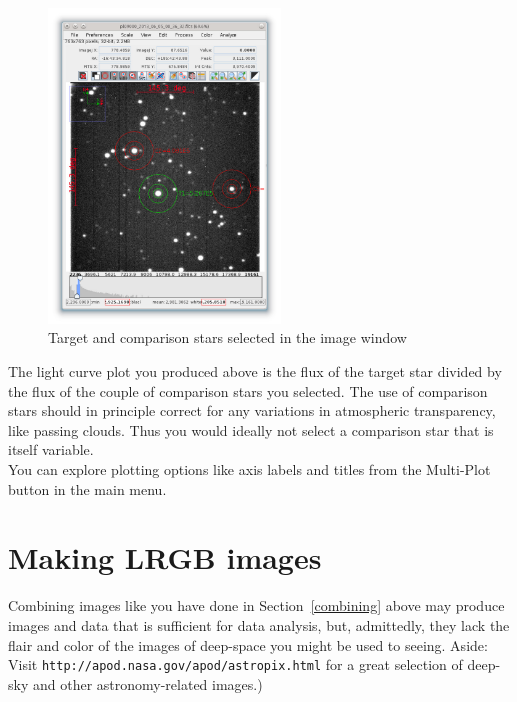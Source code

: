 \documentclass[12pt,twoside,a4paper]{report}
\begin{document}
\begin{enumerate}
  \begin{figure}[ht]
  \centering
    \includegraphics[width=0.55\textwidth]{documentation_images/photometry_targets.jpg}
    \caption{\label{fig:targets}Target and comparison stars selected in the image window}
 \end{figure}
 \end{enumerate}

The light curve plot you produced above is the flux of the target star divided by the flux of the couple of comparison stars you selected. The use of comparison stars should in principle correct for any variations in atmospheric transparency, like passing clouds. Thus you would ideally not select a comparison star that is itself variable.\\

You can explore plotting options like axis labels and titles from the Multi-Plot button in the main menu.



\section{Making LRGB images}
Combining images like you have done in Section~\ref{combining} above may produce images and data that is sufficient for data analysis, but, admittedly, they lack the flair and color of the images of deep-space you might be used to seeing. Aside: Visit {\tt http://apod.nasa.gov/apod/astropix.html} for a great selection of deep-sky and other astronomy-related images.)\\
\end{document}
